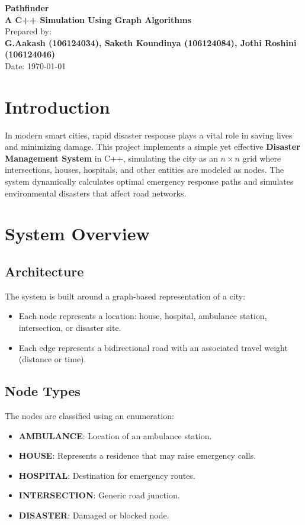 \documentclass[12pt,a4paper]{report}
\begin{document}
\begin{titlepage}
\centering
{\Huge \textbf{Pathfinder}}\\[1cm]
{\Large \textbf{A C++ Simulation Using Graph Algorithms}}\\[2cm]
{\Large Prepared by:}\\
\textbf{G.Aakash (106124034), Saketh Koundinya (106124084), Jothi Roshini (106124046)}\\[1cm]
{\Large Date: \today}\\[3cm]
\vfill
\end{titlepage}


\tableofcontents
\newpage

\chapter{Introduction}

In modern smart cities, rapid disaster response plays a vital role in saving lives and minimizing damage.
This project implements a simple yet effective \textbf{Disaster Management System} in C++, simulating
the city as an $n \times n$ grid where intersections, houses, hospitals, and other entities are modeled as nodes.
The system dynamically calculates optimal emergency response paths and simulates environmental disasters
that affect road networks.

\chapter{System Overview}

\section{Architecture}
The system is built around a graph-based representation of a city:
\begin{itemize}
\item Each node represents a location: house, hospital, ambulance station, intersection, or disaster site.
\item Each edge represents a bidirectional road with an associated travel weight (distance or time).
\end{itemize}

\section{Node Types}
The nodes are classified using an enumeration:
\begin{itemize}
\item \textbf{AMBULANCE}: Location of an ambulance station.
\item \textbf{HOUSE}: Represents a residence that may raise emergency calls.
\item \textbf{HOSPITAL}: Destination for emergency routes.
\item \textbf{INTERSECTION}: Generic road junction.
\item \textbf{DISASTER}: Damaged or blocked node.
\end{itemize}
\end{document}
